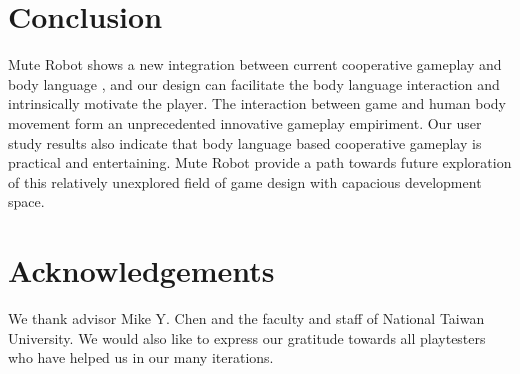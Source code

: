 \documentclass{chi-ext}
\begin{document}
\section{Conclusion}
Mute Robot shows a new integration between current cooperative gameplay and body language
, and our design can facilitate the body language interaction and intrinsically motivate the player.
The interaction between game and human body movement form an unprecedented innovative gameplay empiriment.
Our user study results also indicate that body language based cooperative gameplay is practical and entertaining.
Mute Robot provide a path towards future exploration of this relatively unexplored field of game design with capacious development space.



\section{Acknowledgements}
We thank advisor Mike Y. Chen and the faculty and staff of National Taiwan University.
We would also like to express our gratitude towards all playtesters who have helped us in our many iterations. 



\balance


\end{document}
